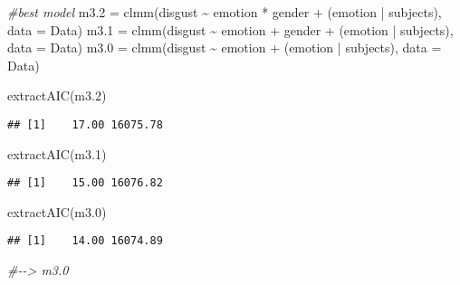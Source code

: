 \documentclass[
]{article}
\newenvironment{Shaded}{\begin{snugshade}}{\end{snugshade}}
\newcommand{\AttributeTok}[1]{\textcolor[rgb]{0.77,0.63,0.00}{#1}}
\newcommand{\CommentTok}[1]{\textcolor[rgb]{0.56,0.35,0.01}{\textit{#1}}}
\newcommand{\FloatTok}[1]{\textcolor[rgb]{0.00,0.00,0.81}{#1}}
\newcommand{\FunctionTok}[1]{\textcolor[rgb]{0.00,0.00,0.00}{#1}}
\newcommand{\NormalTok}[1]{#1}
\newcommand{\OtherTok}[1]{\textcolor[rgb]{0.56,0.35,0.01}{#1}}
\newcommand{\SpecialCharTok}[1]{\textcolor[rgb]{0.00,0.00,0.00}{#1}}
\begin{document}
\begin{Shaded}
\begin{Highlighting}[]
\CommentTok{\#best model}
\NormalTok{m3}\FloatTok{.2} \OtherTok{=} \FunctionTok{clmm}\NormalTok{(disgust }\SpecialCharTok{\textasciitilde{}}\NormalTok{ emotion }\SpecialCharTok{*}\NormalTok{ gender }\SpecialCharTok{+}\NormalTok{ (emotion }\SpecialCharTok{|}\NormalTok{ subjects), }\AttributeTok{data =}\NormalTok{ Data)}
\NormalTok{m3}\FloatTok{.1} \OtherTok{=} \FunctionTok{clmm}\NormalTok{(disgust }\SpecialCharTok{\textasciitilde{}}\NormalTok{ emotion }\SpecialCharTok{+}\NormalTok{ gender }\SpecialCharTok{+}\NormalTok{ (emotion }\SpecialCharTok{|}\NormalTok{ subjects), }\AttributeTok{data =}\NormalTok{ Data)}
\NormalTok{m3}\FloatTok{.0} \OtherTok{=} \FunctionTok{clmm}\NormalTok{(disgust }\SpecialCharTok{\textasciitilde{}}\NormalTok{ emotion }\SpecialCharTok{+}\NormalTok{ (emotion }\SpecialCharTok{|}\NormalTok{ subjects), }\AttributeTok{data =}\NormalTok{ Data)}

\FunctionTok{extractAIC}\NormalTok{(m3}\FloatTok{.2}\NormalTok{)}
\end{Highlighting}
\end{Shaded}

\begin{verbatim}
## [1]    17.00 16075.78
\end{verbatim}

\begin{Shaded}
\begin{Highlighting}[]
\FunctionTok{extractAIC}\NormalTok{(m3}\FloatTok{.1}\NormalTok{)}
\end{Highlighting}
\end{Shaded}

\begin{verbatim}
## [1]    15.00 16076.82
\end{verbatim}

\begin{Shaded}
\begin{Highlighting}[]
\FunctionTok{extractAIC}\NormalTok{(m3}\FloatTok{.0}\NormalTok{)}
\end{Highlighting}
\end{Shaded}

\begin{verbatim}
## [1]    14.00 16074.89
\end{verbatim}

\begin{Shaded}
\begin{Highlighting}[]
\CommentTok{\#{-}{-}\textgreater{} m3.0}
\end{Highlighting}
\end{Shaded}
\end{document}
